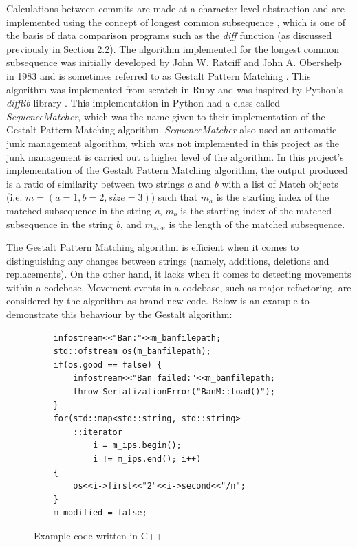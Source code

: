 Calculations between commits are made at a character-level abstraction and are implemented using the concept of longest common subsequence \citep{wiki:lcs}, which is one of the basis of data comparison programs such as the \textit{diff} function (as discussed previously in Section 2.2). The algorithm implemented for the longest common subsequence was initially developed by John W. Ratciff and John A. Obershelp in 1983 and is sometimes referred to as Gestalt Pattern Matching \citep{wiki:gpm}. This algorithm was implemented from scratch in Ruby and was inspired by Python's \textit{difflib} library \citep{python_software_foundation_2021}. This implementation in Python had a class called \textit{SequenceMatcher}, which was the name given to their implementation of the Gestalt Pattern Matching algorithm. \textit{SequenceMatcher} also used an automatic junk management algorithm, which was not implemented in this project as the junk management is carried out a higher level of the algorithm. In this project's implementation of the Gestalt Pattern Matching algorithm, the output produced is a ratio of similarity between two strings \textit{a} and \textit{b} with a list of Match objects (i.e. $m = (a = 1, b = 2, size = 3)$) such that \textit{$m_a$} is the starting index of the matched subsequence in the string \textit{a}, \textit{$m_b$} is the starting index of the matched subsequence in the string \textit{b}, and \textit{$m_{size}$} is the length of the matched subsequence.

The Gestalt Pattern Matching algorithm is efficient when it comes to distinguishing any changes between strings (namely, additions, deletions and replacements). On the other hand, it lacks when it comes to detecting movements within a codebase. Movement events in a codebase, such as major refactoring, are considered by the algorithm as brand new code. Below is an example to demonstrate this behaviour by the Gestalt algorithm:
\begin{figure}
    \centering
    \begin{verbatim}
    infostream<<"Ban:"<<m_banfilepath;
    std::ofstream os(m_banfilepath);
    if(os.good == false) {
        infostream<<"Ban failed:"<<m_banfilepath;
        throw SerializationError("BanM::load()");
    }
    for(std::map<std::string, std::string>
        ::iterator
            i = m_ips.begin();
            i != m_ips.end(); i++)
    {
        os<<i->first<<"2"<<i->second<<"/n";
    }
    m_modified = false;
    \end{verbatim}
    \caption{Example code written in C++ \citep{ahola_2018}}
    \label{fig:1}
\end{figure}



